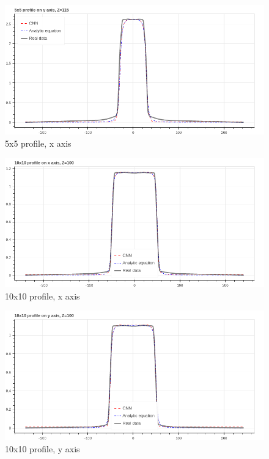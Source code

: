 \documentclass[openany]{article}
\begin{document}
\begin{figure}[!h]
    \centering
    \includegraphics[width=\textwidth]{5_5_y_axis.png}
    \caption{5x5 profile, x axis}
    \label{fig:my_label}
\end{figure}

\newpage 

\begin{figure}[!h]
    \centering
    \includegraphics[width=\textwidth]{10_10_x_axis.png}
    \caption{10x10 profile, x axis}
    \label{fig:my_label}
\end{figure}


\begin{figure}[!h]
    \centering
    \includegraphics[width=\textwidth]{10_10_y_axis.png}
    \caption{10x10 profile, y axis}
    \label{fig:my_label}
\end{figure}
\end{document}
